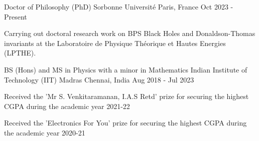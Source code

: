 

\begin{cventries}

\cventry
    {Doctor of Philosophy (PhD) } %
    {Sorbonne Université} %
    {Paris, France} %
    {Oct 2023 - Present} %
    {
      \begin{cvitems} %
        \item {Carrying out doctoral research work on BPS Black Holes and Donaldson-Thomas invariants at the Laboratoire de Physique Théorique et Hautes Energies (LPTHE).}
      \end{cvitems}
    }

  \cventry
    {BS (Hons) and MS in Physics with a minor in Mathematics } %
    {Indian Institute of Technology (IIT) Madras} %
    {Chennai, India} %
    {Aug 2018 - Jul 2023} %
    {
      \begin{cvitems} %
        \item {Received the 'Mr S. Venkitaramanan, I.A.S Retd' prize for securing the highest CGPA during the academic year 2021-22}
        \item {Received the 'Electronics For You' prize for securing the highest CGPA during the academic year 2020-21}
      \end{cvitems}
    }

\end{cventries}
